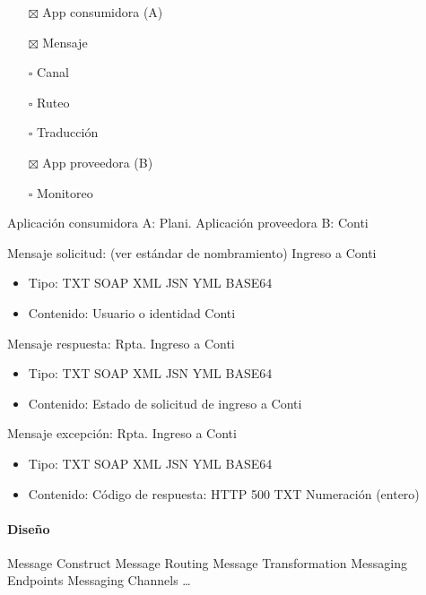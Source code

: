 \documentclass[
  paper=a4,
  ,captions=tableheading
]{scrartcl}
\providecommand{\tightlist}{%
  \setlength{\itemsep}{0pt}\setlength{\parskip}{0pt}}
\begin{document}
\begin{itemize}
\tightlist
\item[$\boxtimes$]
  App consumidora (A)
\item[$\boxtimes$]
  Mensaje
\item[$\square$]
  Canal
\item[$\square$]
  Ruteo
\item[$\square$]
  Traducción
\item[$\boxtimes$]
  App proveedora (B)
\item[$\square$]
  Monitoreo
\end{itemize}

Aplicación consumidora A: Plani. Aplicación proveedora B: Conti

Mensaje solicitud: (ver estándar de nombramiento) Ingreso a Conti

\begin{itemize}
\tightlist
\item
  Tipo: TXT \textbar{} SOAP \textbar{} XML \textbar{} JSN \textbar{} YML
  \textbar{} BASE64
\item
  Contenido: Usuario o identidad Conti
\end{itemize}

Mensaje respuesta: Rpta. Ingreso a Conti

\begin{itemize}
\tightlist
\item
  Tipo: TXT \textbar{} SOAP \textbar{} XML \textbar{} JSN \textbar{} YML
  \textbar{} BASE64
\item
  Contenido: Estado de solicitud de ingreso a Conti
\end{itemize}

Mensaje excepción: Rpta. Ingreso a Conti

\begin{itemize}
\tightlist
\item
  Tipo: TXT \textbar{} SOAP \textbar{} XML \textbar{} JSN \textbar{} YML
  \textbar{} BASE64
\item
  Contenido: Código de respuesta: HTTP 500 \textbar{} TXT \textbar{}
  Numeración (entero)
\end{itemize}

\paragraph{Diseño}\label{sec:diseuxf1o}

Message Construct \textbar{} Message Routing \textbar{} Message
Transformation \textbar{} Messaging Endpoints \textbar{} Messaging
Channels \textbar{} \ldots{}
\end{document}
